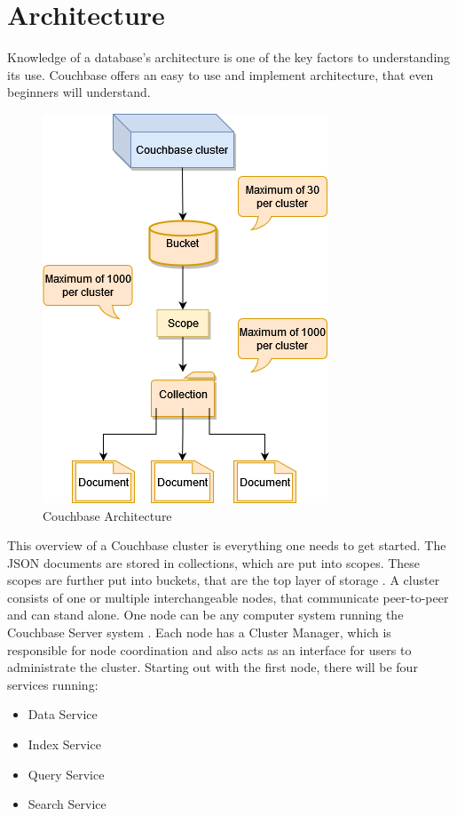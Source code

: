 \section{Architecture}
Knowledge of a database's architecture is one of the key factors to understanding its use. Couchbase offers an easy to use and implement architecture, that even beginners will understand.
\begin{figure}[H]
    \centering
        \includegraphics[scale=0.8]{images/CouchbaseArchitecture.drawio.png}
    \caption{Couchbase Architecture \parencite{CouchbaseArchitecture}}
    \label{fig:CouchbaseArchitecture}
\end{figure}
This overview of a Couchbase cluster is everything one needs to get started. The \ac{JSON} documents are stored in collections, which are put into scopes. These scopes are further put into buckets, that are the top layer of storage \parencite{CouchbaseIntroduction}. \newline
A cluster consists of one or multiple interchangeable nodes, that communicate peer-to-peer and can stand alone. One node can be any computer system running the Couchbase Server system \parencite{CouchbasePaper}. \newline 
Each node has a Cluster Manager, which is responsible for node coordination and also acts as an interface for users to administrate the cluster. Starting out with the first node, there will be four services running:
\begin{itemize}
    \item Data Service
    \item Index Service
    \item Query Service
    \item Search Service
\end{itemize}
